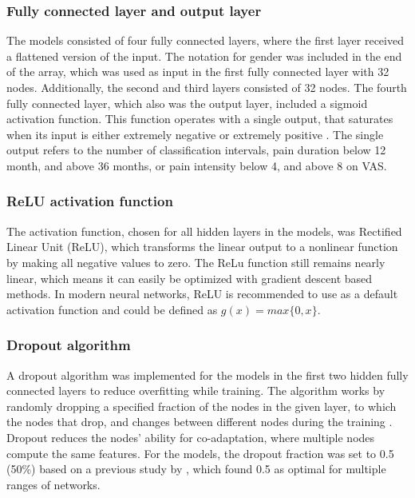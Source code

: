 \subsubsection{Fully connected layer and output layer}
The models consisted of four fully connected layers, where the first layer received a flattened version of the input. The notation for gender was included in the end of the array, which was used as input in the first fully connected layer with 32 nodes. Additionally, the second and third layers consisted of 32 nodes. The fourth fully connected layer, which also was the output layer, included a sigmoid activation function. 
This function operates with a single output, that saturates when its input is either extremely negative or extremely positive \citep{Goodfellow2016}. The single output refers to the number of classification intervals, pain duration below 12 month, and above 36 months, or pain intensity below 4, and above 8 on VAS. 

\subsubsection{ReLU activation function}
The activation function, chosen for all hidden layers in the models, was Rectified Linear Unit (ReLU), which transforms the linear output to a nonlinear function by making all negative values to zero. The ReLu function still remains nearly linear, which means it can easily be optimized with gradient descent based methods. In modern neural networks, ReLU is recommended to use as a default activation function and could be defined as $g(x) = max\{0, x\}$.\citep{Goodfellow2016}

\subsubsection{Dropout algorithm}
A dropout algorithm was implemented for the models in the first two hidden fully connected layers to reduce overfitting while training. The algorithm works by randomly dropping a specified fraction of the nodes in the given layer, to which the nodes that drop, and changes between different nodes during the training \citep{Srivastava2014}. Dropout reduces the nodes’ ability for co-adaptation, where multiple nodes compute the same features. For the models, the dropout fraction was set to 0.5 (50\%) based on a previous study by \citeauthor{Srivastava2014} \citep{Srivastava2014}, which found 0.5 as optimal for multiple ranges of networks.

